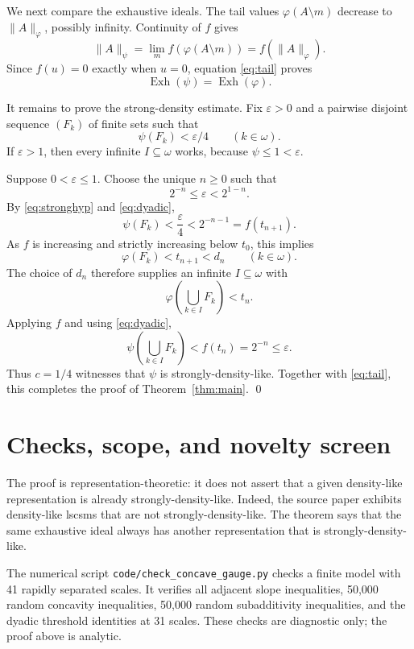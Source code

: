 \documentclass[11pt]{article}
\newcommand{\Exh}{\operatorname{Exh}}
\begin{document}
We next compare the exhaustive ideals. The tail values $\varphi(A\setminus m)$ decrease to $\|A\|_\varphi$, possibly infinity. Continuity of $f$ gives
\begin{equation}\label{eq:tail}
 \|A\|_\psi
 =\lim_m f(\varphi(A\setminus m))
 =f(\|A\|_\varphi).
\end{equation}
Since $f(u)=0$ exactly when $u=0$, equation \eqref{eq:tail} proves
\[
 \Exh(\psi)=\Exh(\varphi).
\]

It remains to prove the strong-density estimate. Fix $\varepsilon>0$ and a pairwise disjoint sequence $(F_k)$ of finite sets such that
\begin{equation}\label{eq:stronghyp}
 \psi(F_k)<\varepsilon/4\qquad(k\in\omega).
\end{equation}
If $\varepsilon>1$, then every infinite $I\subseteq\omega$ works, because $\psi\le1<\varepsilon$.

Suppose $0<\varepsilon\le1$. Choose the unique $n\ge0$ such that
\begin{equation}\label{eq:dyadic}
 2^{-n}\le\varepsilon<2^{1-n}.
\end{equation}
By \eqref{eq:stronghyp} and \eqref{eq:dyadic},
\[
 \psi(F_k)<\frac{\varepsilon}{4}
 <2^{-n-1}=f(t_{n+1}).
\]
As $f$ is increasing and strictly increasing below $t_0$, this implies
\[
 \varphi(F_k)<t_{n+1}<d_n
 \qquad(k\in\omega).
\]
The choice of $d_n$ therefore supplies an infinite $I\subseteq\omega$ with
\[
 \varphi\left(\bigcup_{k\in I}F_k\right)<t_n.
\]
Applying $f$ and using \eqref{eq:dyadic},
\[
 \psi\left(\bigcup_{k\in I}F_k\right)
 <f(t_n)=2^{-n}\le\varepsilon.
\]
Thus $c=1/4$ witnesses that $\psi$ is strongly-density-like. Together with \eqref{eq:tail}, this completes the proof of Theorem~\ref{thm:main}. \qed

\section{Checks, scope, and novelty screen}

The proof is representation-theoretic: it does not assert that a given density-like representation is already strongly-density-like. Indeed, the source paper exhibits density-like lscsms that are not strongly-density-like. The theorem says that the same exhaustive ideal always has another representation that is strongly-density-like.

The numerical script \texttt{code/check\_concave\_gauge.py} checks a finite model with 41 rapidly separated scales. It verifies all adjacent slope inequalities, 50,000 random concavity inequalities, 50,000 random subadditivity inequalities, and the dyadic threshold identities at 31 scales. These checks are diagnostic only; the proof above is analytic.
\end{document}
